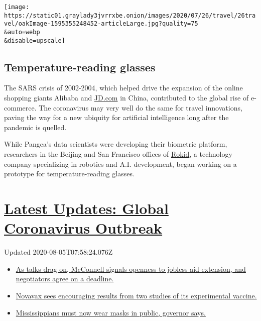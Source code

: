 \texttt{[image: https://static01.graylady3jvrrxbe.onion/images/2020/07/26/travel/26travel/oakImage-1595355248452-articleLarge.jpg?quality=75\\\&auto=webp\\\&disable=upscale]}

\hypertarget{temperature-reading-glasses}{%
\subsection{Temperature-reading
glasses}\label{temperature-reading-glasses}}

The SARS crisis of 2002-2004, which helped drive the expansion of the
online shopping giants Alibaba and \href{http://JD.com}{JD.com} in
China, contributed to the global rise of e-commerce. The coronavirus may
very well do the same for travel innovations, paving the way for a new
ubiquity for artificial intelligence long after the pandemic is quelled.

While Pangea's data scientists were developing their biometric platform,
researchers in the Beijing and San Francisco offices of
\href{https://www.rokid.com/}{Rokid}, a technology company specializing
in robotics and A.I. development, began working on a prototype for
temperature-reading glasses.

\hypertarget{latest-updates-global-coronavirus-outbreak}{%
\section{\texorpdfstring{\href{https://www.nytimes3xbfgragh.onion/2020/08/04/world/coronavirus-cases.html?action=click\&pgtype=Article\&state=default\&region=MAIN_CONTENT_1\&context=storylines_live_updates}{Latest
Updates: Global Coronavirus
Outbreak}}{Latest Updates: Global Coronavirus Outbreak}}\label{latest-updates-global-coronavirus-outbreak}}

Updated 2020-08-05T07:58:24.076Z

\begin{itemize}
\tightlist
\item
  \href{https://www.nytimes3xbfgragh.onion/2020/08/04/world/coronavirus-cases.html?action=click\&pgtype=Article\&state=default\&region=MAIN_CONTENT_1\&context=storylines_live_updates\#link-762df92}{As
  talks drag on, McConnell signals openness to jobless aid extension,
  and negotiators agree on a deadline.}
\item
  \href{https://www.nytimes3xbfgragh.onion/2020/08/04/world/coronavirus-cases.html?action=click\&pgtype=Article\&state=default\&region=MAIN_CONTENT_1\&context=storylines_live_updates\#link-1228a480}{Novavax
  sees encouraging results from two studies of its experimental
  vaccine.}
\item
  \href{https://www.nytimes3xbfgragh.onion/2020/08/04/world/coronavirus-cases.html?action=click\&pgtype=Article\&state=default\&region=MAIN_CONTENT_1\&context=storylines_live_updates\#link-794484ed}{Mississippians
  must now wear masks in public, governor says.}
\end{itemize}

